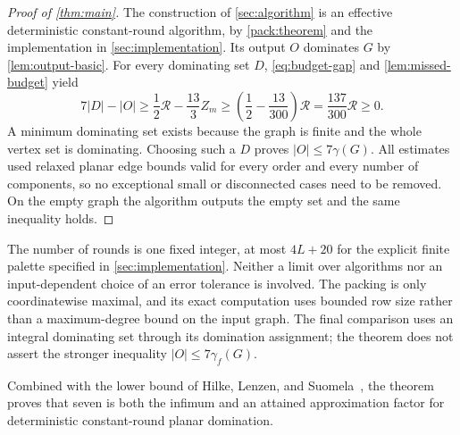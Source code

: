 \documentclass[11pt,a4paper]{article}
\theoremstyle{definition}
\theoremstyle{remark}
\newcommand{\budget}{\mathcal R}
\begin{document}
\begin{proof}[Proof of \cref{thm:main}]
The construction of \cref{sec:algorithm} is an effective deterministic
constant-round algorithm, by \cref{pack:theorem} and the implementation
in \cref{sec:implementation}. Its output \(O\) dominates \(G\) by
\cref{lem:output-basic}. For every dominating set \(D\),
\eqref{eq:budget-gap} and \cref{lem:missed-budget} yield
\[
 7|D|-|O|
 \geq\frac12\budget-\frac{13}{3}Z_m
 \geq\left(\frac12-\frac{13}{300}\right)\budget
 =\frac{137}{300}\budget\geq0.
\]
A minimum dominating set exists because the graph is finite and the
whole vertex set is dominating. Choosing such a \(D\) proves
\(|O|\leq7\gamma(G)\). All estimates used relaxed planar edge bounds
valid for every order and every number of components, so no exceptional
small or disconnected cases need to be removed. On the empty graph
the algorithm outputs the empty set and the same inequality holds.
\end{proof}

The number of rounds is one fixed integer, at most \(4L+20\) for the
explicit finite palette specified in \cref{sec:implementation}.
Neither a limit over algorithms nor an input-dependent choice of an
error tolerance is involved. The packing is only coordinatewise
maximal, and its exact computation uses bounded row size rather than
a maximum-degree bound on the input graph. The final comparison
uses an integral dominating set through its domination assignment;
the theorem does not assert the stronger inequality
\(|O|\leq7\gamma_f(G)\).

Combined with the lower bound of Hilke, Lenzen, and Suomela~\cite{HLS14},
the theorem proves that seven is both the infimum and an attained
approximation factor for deterministic constant-round planar domination.
\end{document}
